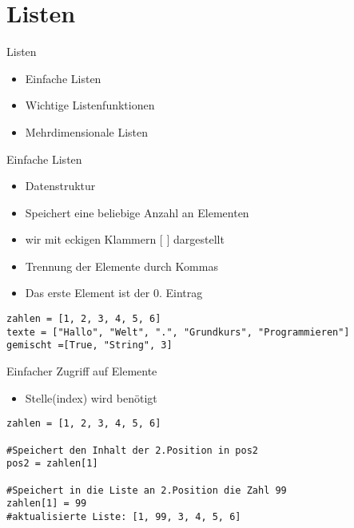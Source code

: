 \section{Listen}

\begin{frame}[fragile]{Listen}
\begin{itemize}
	\item Einfache Listen
	\item Wichtige Listenfunktionen
	\item Mehrdimensionale Listen
\end{itemize}
\end{frame}

\begin{frame}[fragile]{Einfache Listen}
	\begin{itemize}
		\item Datenstruktur
		\item Speichert eine beliebige Anzahl an Elementen
		\item wir mit eckigen Klammern $[$ $]$ dargestellt
		\item Trennung der Elemente durch Kommas
		\item Das erste Element ist der 0. Eintrag 
		
	\end{itemize}
\begin{lstlisting}
zahlen = [1, 2, 3, 4, 5, 6]
texte = ["Hallo", "Welt", ".", "Grundkurs", "Programmieren"]
gemischt =[True, "String", 3]
\end{lstlisting}
\end{frame}

\begin{frame}[fragile]{Einfacher Zugriff auf Elemente}
\begin{itemize}
	\item Stelle(index) wird benötigt	
\end{itemize}
\begin{lstlisting}
zahlen = [1, 2, 3, 4, 5, 6]

#Speichert den Inhalt der 2.Position in pos2
pos2 = zahlen[1]

#Speichert in die Liste an 2.Position die Zahl 99
zahlen[1] = 99
#aktualisierte Liste: [1, 99, 3, 4, 5, 6]
\end{lstlisting}
\end{frame}

